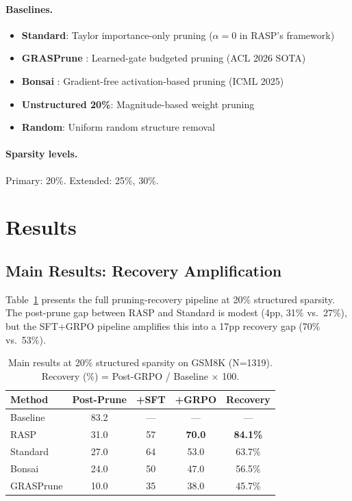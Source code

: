 \documentclass[11pt,a4paper]{article}
\newcommand{\method}{RASP}
\begin{document}
\paragraph{Baselines.}
\begin{itemize}
\item \textbf{Standard}: Taylor importance-only pruning ($\alpha = 0$ in \method{}'s framework)
\item \textbf{GRASPrune} \cite{graspprune2026}: Learned-gate budgeted pruning (ACL 2026 SOTA)
\item \textbf{Bonsai} \cite{bonsai2025}: Gradient-free activation-based pruning (ICML 2025)
\item \textbf{Unstructured 20\%}: Magnitude-based weight pruning
\item \textbf{Random}: Uniform random structure removal
\end{itemize}

\paragraph{Sparsity levels.} Primary: 20\%. Extended: 25\%, 30\%.

\section{Results}
\label{sec:results}

\subsection{Main Results: Recovery Amplification}
\label{sec:main_results}

Table~\ref{tab:main} presents the full pruning-recovery pipeline at 20\% structured sparsity. The post-prune gap between \method{} and Standard is modest (4pp, 31\% vs.\ 27\%), but the SFT+GRPO pipeline amplifies this into a 17pp recovery gap (70\% vs.\ 53\%).

\begin{table}[t]
\centering
\small
\caption{Main results at 20\% structured sparsity on GSM8K (N=1319). Recovery (\%) = Post-GRPO / Baseline $\times$ 100.}
\label{tab:main}
\begin{tabular}{lcccc}
\toprule
\textbf{Method} & \textbf{Post-Prune} & \textbf{+SFT} & \textbf{+GRPO} & \textbf{Recovery} \\
\midrule
Baseline & 83.2 & --- & --- & --- \\
\method{} & 31.0 & 57 & \textbf{70.0} & \textbf{84.1\%} \\
Standard & 27.0 & 64 & 53.0 & 63.7\% \\
Bonsai & 24.0 & 50 & 47.0 & 56.5\% \\
GRASPrune & 10.0 & 35 & 38.0 & 45.7\% \\
\bottomrule
\end{tabular}
\end{table}
\end{document}
